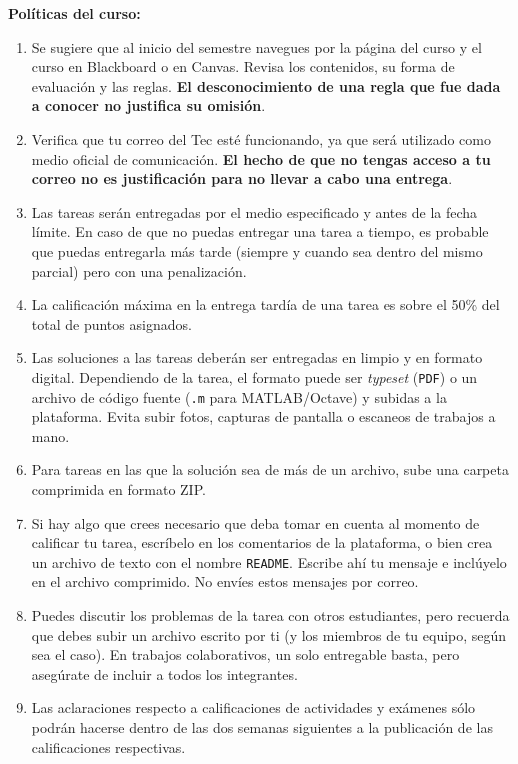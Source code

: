 \documentclass[12pt, letterpaper, oneside]{article}
\begin{document}
  \noindent\textbf{Políticas del curso:}  
  \begin{enumerate}
  \item Se sugiere que al inicio del semestre navegues por la página del curso y el curso en Blackboard o en Canvas. Revisa los contenidos, su forma de evaluación y las reglas. \textbf{El desconocimiento de una regla que fue dada a conocer no justifica su omisión}.
  \item Verifica que tu correo del Tec esté funcionando, ya que será utilizado como medio oficial de comunicación. \textbf{El hecho de que no tengas acceso a tu correo no es justificación para no llevar a cabo una entrega}.
  \item Las tareas serán entregadas por el medio especificado y antes de la fecha límite. En caso de que no puedas entregar una tarea a tiempo, es probable que puedas entregarla más tarde (siempre y cuando sea dentro del mismo parcial) pero con una penalización.
  \item La calificación máxima en la entrega tardía de una tarea es sobre el 50\% del total de puntos asignados.
  \item Las soluciones a las tareas deberán ser entregadas en limpio y en formato digital. Dependiendo de la tarea, el formato puede ser \textit{typeset} (\texttt{PDF}) o un archivo de código fuente (\texttt{.m} para MATLAB/Octave) y subidas a la plataforma. Evita subir fotos, capturas de pantalla o escaneos de trabajos a mano.
  \item Para tareas en las que la solución sea de más de un archivo, sube una carpeta comprimida en formato ZIP.
  \item Si hay algo que crees necesario que deba tomar en cuenta al momento de calificar tu tarea, escríbelo en los comentarios de la plataforma, o bien crea un archivo de texto con el nombre \texttt{README}. Escribe ahí tu mensaje e inclúyelo en el archivo comprimido. No envíes estos mensajes por correo.
  \item Puedes discutir los problemas de la tarea con otros estudiantes, pero recuerda que debes subir un archivo escrito por ti (y los miembros de tu equipo, según sea el caso). En trabajos colaborativos, un solo entregable basta, pero asegúrate de incluir a todos los integrantes.
  \item Las aclaraciones respecto a calificaciones de actividades y exámenes sólo podrán hacerse dentro de las dos semanas siguientes a la publicación de las calificaciones respectivas.

\end{enumerate}
\end{document}
